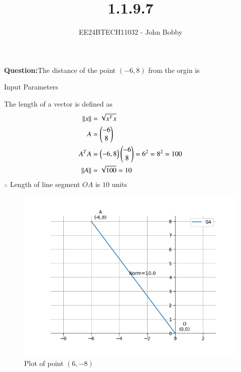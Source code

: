\documentclass[journal]{IEEEtran}
\begin{document}

\vspace{3cm}
\title{1.1.9.7}
\author{EE24BTECH11032 - John Bobby}
{\let\newpage\relax\maketitle}

\renewcommand{\thefigure}{\theenumi}
\renewcommand{\thetable}{\theenumi}
\setlength{\intextsep}{10pt} %


\renewcommand{\thetable}{\theenumi}


\textbf{Question:}The distance of the point $(-6,8)$ from the orgin is\\
\begin{table}[h!]    
  \centering
  
  \caption{Input Parameters}
  \label{tab1.1.9.7}
\end{table}
\solution The length of a vector is defined as\\
\begin{align}
	\left\lVert x\right\rVert &= \sqrt{x^Tx}\\
	A &=\begin{pmatrix}-6\\8\end{pmatrix} \\
	A^TA &=\begin{pmatrix}-6, 8\end{pmatrix}\begin{pmatrix}-6\\8\end{pmatrix} = 6^2=8^2=100\\
	\left\lVert A\right\rVert &= \sqrt{100}=10
\end{align}
$\therefore$ Length of line segment $OA$ is $10$ units
\begin{figure}[h!]
                \centering
               \includegraphics[width=0.7\linewidth]{Figs/Fig1.png}
			\caption{Plot of point $(6,-8)$}
               \label{stemplot}
               \end{figure}
\end{document}

